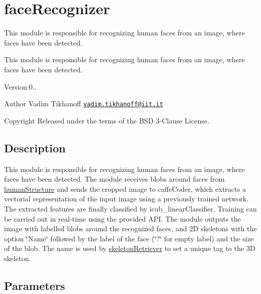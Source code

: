 \section{face\+Recognizer}
\label{group__faceRecognizer}


This module is responsible for recognizing human faces from an image, where faces have been detected.  


This module is responsible for recognizing human faces from an image, where faces have been detected. 

Version\+:0.. \begin{DoxyAuthor}{Author}
Vadim Tikhanoff \href{mailto:vadim.tikhanoff@iit.it}{\tt vadim.\+tikhanoff@iit.\+it} ~\newline
 
\end{DoxyAuthor}
\begin{DoxyCopyright}{Copyright}
Released under the terms of the B\+SD 3-\/\+Clause License. 
\end{DoxyCopyright}
\hypertarget{group__skeletonViewer_intro_sec}{}\subsection{Description}\label{group__skeletonViewer_intro_sec}
This module is responsible for recognizing human faces from an image, where faces have been detected. The module receives blobs around faces from \hyperlink{group__humanStructure}{human\+Structure} and sends the cropped image to caffe\+Coder, which extracts a vectorial representation of the input image using a previously trained network. The extracted features are finally classified by icub\+\_\+linear\+Classifier. Training can be carried out in real-\/time using the provided A\+PI. The module outputs the image with labelled blobs around the recognized faces, and 2D skeletons with the option \char`\"{}\+Name\char`\"{} followed by the label of the face (\char`\"{}?\char`\"{} for empty label) and the size of the blob. The name is used by \hyperlink{group__skeletonRetriever}{skeleton\+Retriever} to set a unique tag to the 3D skeleton.\hypertarget{group__skeletonViewer_parameters_sec}{}\subsection{Parameters}\label{group__skeletonViewer_parameters_sec}

